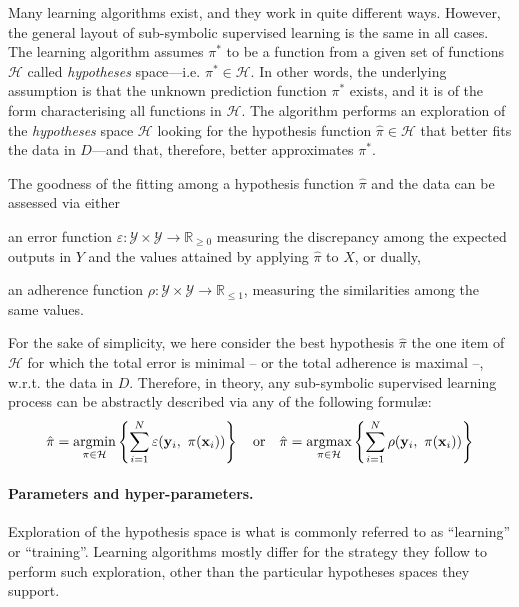 \documentclass[12pt,a4paper,openright,twoside]{book}
\begin{document}
Many learning algorithms exist, and they work in quite different ways.
%
However, the general layout of sub-symbolic supervised learning is the same in all cases.
%
The learning algorithm assumes $\pi^*$ to be a function from a given set of functions $\mathcal{H}$ called \emph{hypotheses} space---i.e. $\pi^* \in \mathcal{H}$.
%
In other words, the underlying assumption is that the unknown prediction function $\pi^*$ exists, and it is of the form characterising all functions in $\mathcal{H}$.
%
The algorithm performs an exploration of the \emph{hypotheses} space $\mathcal{H}$ looking for the hypothesis function $\hat{\pi} \in \mathcal{H}$ that better fits the data in $D$---and that, therefore, better approximates $\pi^*$.

The goodness of the fitting among a hypothesis function $\hat{\pi}$ and the data can be assessed via either 
%
\begin{inlinelist}
    \item an error function $\varepsilon : \mathcal{Y} \times \mathcal{Y} \rightarrow \mathbb{R}_{\geq 0}$ measuring the discrepancy among the expected outputs in $Y$ and the values attained by applying $\hat{\pi}$ to $X$, or dually,
    \item an adherence function $\rho : \mathcal{Y} \times \mathcal{Y} \rightarrow \mathbb{R}_{\leq 1}$, measuring the similarities among the same values.
\end{inlinelist}
%
For the sake of simplicity, we here consider the best hypothesis $\hat{\pi}$ the one item of $\mathcal{H}$ for which the total error is minimal -- or the total adherence is maximal --, w.r.t. the data in $D$. 
%
Therefore, in theory, any sub-symbolic supervised learning process can be abstractly described via any of the following formul\ae{}:
%
$$
\hat{\pi} = \underset{\pi \in \mathcal{H}}{\text{argmin}} \left\{  \sum_{i=1}^{N} \varepsilon(\mathbf{y}_i,\ \pi(\mathbf{x}_i))  \right\}
\quad \text{or} \quad
\hat{\pi} = \underset{\pi \in \mathcal{H}}{\text{argmax}} \left\{  \sum_{i=1}^{N} \rho(\mathbf{y}_i,\ \pi(\mathbf{x}_i))  \right\}
$$

\paragraph{Parameters and hyper-parameters.}

Exploration of the hypothesis space is what is commonly referred to as ``learning'' or ``training''.
%
Learning algorithms mostly differ for the strategy they follow to perform such exploration, other than the particular hypotheses spaces they support.
\end{document}
